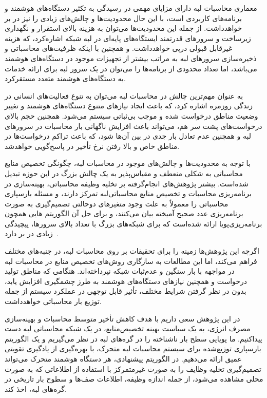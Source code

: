معماری محاسبات لبه دارای مزایای مهمی در رسیدگی به تکثیر دستگاه‌های هوشمند و برنامه‌های کاربردی است، با این حال محدودیت‌ها و چالش‌های زیادی را نیز در بر خواهد‌داشت. از جمله این محدودیت‌ها می‌توان به هزینه بالای استقرار و نگهداری زیرساخت‌ و سرورهای قدرتمند ایستگاه‌های پایه‌ای در لبه شبکه اشاره‌کرد، که هزینه غیرقابل قبولی درپی خواهد‌داشت. و همچنین با اینکه ظرفیت‌های محاسباتی و ذخیره‌سازی سرورهای لبه به مراتب بیشتر از تجهیزات موجود در دستگاه‌های هوشمند می‌باشد، اما تعداد محدودی از برنامه‌ها را می‌توان در یک سرور لبه برای ارائه خدمات به دستگاه‌های هوشمند متعدد مستقرکرد. 

به عنوان مهم‌ترین چالش در محاسبات لبه می‌توان به تنوع فعالیت‌های انسانی در زندگی روزمره اشاره کرد، که باعث ایجاد نیازهای متنوع دستگاه‌های هوشمند و تغییر وضعیت مناطق درخواست شده و موجب بی‌ثباتی سیستم می‌شود. همچنین حجم بالای درخواست‌های پشت سر هم، می‌تواند باعث افزایش ناگهانی بار محاسبات در سرورهای لبه و همچنین عدم تعادل بار جدی در بین آن‌ها شود، که باعث تراکم درخواست‌ها در مناطق خاص و بالا رفتن نرخ تأخیر در پاسخ‌گویی خواهدشد.


با توجه به محدودیت‌ها و چالش‌های موجود در محاسبات لبه، چگونگی تخصیص منابع محاسباتی به شکلی منعطف و مقیاس‌پذیر به یک چالش بزرگ در این حوزه تبدیل شده‌است. بیشتر پژوهش‌های انجام‌گرفته بر تخلیه وظیفه محاسباتی، بهینه‌سازی در برنامه‌ریزی محاسبات و تخصیص منابع محاسباتی‌لبه تمرکز دارند، و مسئله بارسپاری محاسباتی را معمولاً به علت وجود متغیرهای دوحالتی تصمیم‌گیری به صورت برنامه‌ریزی عدد صحیح آمیخته  بیان می‌کنند، و برای حل آن الگوریتم هایی همچون برنامه‌ریزی‌پویا ارائه شده‌است که برای شبکه‌های بزرگ با تعداد بالای سرورها، پیچیدگی زیادی در بر دارد~\cite{bertsekas2012dynamic}. 

اگرچه این پژوهش‌ها زمینه را برای تحقیقات بر روی محاسبات لبه، در جنبه‌های مختلف فراهم می‌کند، اما این مطالعات به سازگاری روش‌های تخصیص منابع در محاسبات لبه در مواجهه با بار سنگین و عدم‌ثبات شبکه نپرداخته‌اند. هنگامی که مناطق تولید درخواست و همچنین نیازهای دستگاه‌های هوشمند به طرز چشمگیری  افزایش یابد، بدون در نظر گرفتن شرایط مختلف، تأثیر قابل توجهی در عملکرد سیستم از جمله توزیع بار محاسباتی خواهدداشت. 



در این پژوهش سعی داریم با هدف کاهش تأخیر متوسط محاسبات و بهینه‌سازی مصرف انرژی، به یک سیاست بهینه تخصیص‌منابع، در یک شبکه محاسباتی لبه دست پیداکنیم. ما پویایی سطح بار ناشناخته را در گره‌های لبه در نظر می‌گیریم و یک الگوریتم بارسپاری توزیع‌شده برای سیستم محاسبات لبه متحرک، با بهره‌گیری از یادگیری تقویتی عمیق ارائه می‌دهیم. در الگوریتم پیشنهادی، هر دستگاه هوشمند متحرک می‌تواند تصمیم‌گیری تخلیه وظایف را به صورت غیرمتمرکز با استفاده از اطلاعاتی که به صورت محلی مشاهده می‌شود، از جمله اندازه وظیفه، اطلاعات صف‌ها و سطوح بار تاریخی در گره‌های لبه، اخذ کند. 

